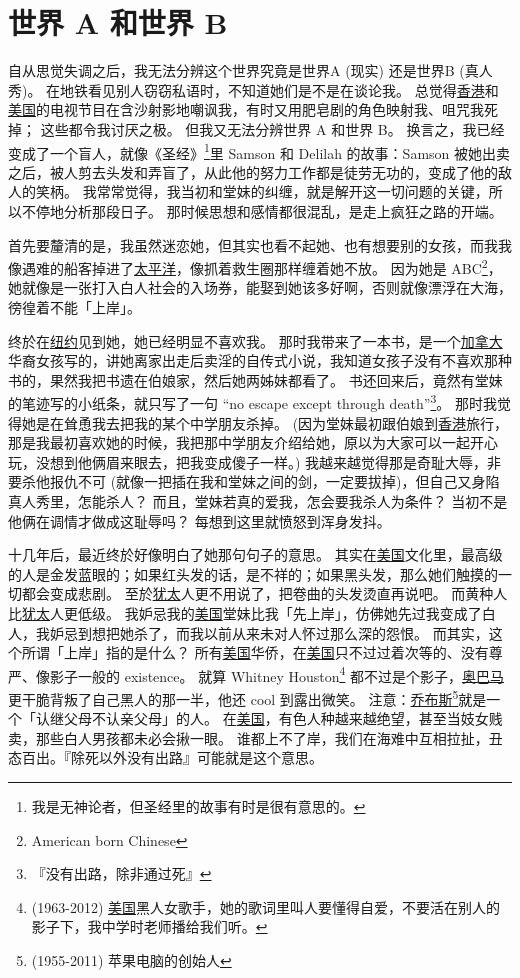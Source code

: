 \documentclass[12pt]{report}
\begin{document}
\chapter{世界 A 和世界 B}

自从思觉失调之后，我无法分辨这个世界究竟是世界A (现实) 还是世界B (真人秀)。 在地铁看见别人窃窃私语时，不知道她们是不是在谈论我。 总觉得\uline{香港}和\uline{美国}的电视节目在含沙射影地嘲讽我，有时又用肥皂剧的角色映射我、咀咒我死掉； 这些都令我讨厌之极。 但我又无法分辨世界 A 和世界 B。 换言之，我已经变成了一个盲人，就像《圣经》\footnote{我是无神论者，但圣经里的故事有时是很有意思的。}里 Samson 和 Delilah 的故事：Samson 被她出卖之后，被人剪去头发和弄盲了，从此他的努力工作都是徒劳无功的，变成了他的敌人的笑柄。 我常常觉得，我当初和堂妹的纠缠，就是解开这一切问题的关键，所以不停地分析那段日子。 那时候思想和感情都很混乱，是走上疯狂之路的开端。

首先要釐清的是，我虽然迷恋她，但其实也看不起她、也有想要别的女孩，而我我像遇难的船客掉进了\uline{太平洋}，像抓着救生圈那样缠着她不放。 因为她是 ABC\footnote{American born Chinese}，她就像是一张打入白人社会的入场券，能娶到她该多好啊，否则就像漂浮在大海，徬徨着不能「上岸」。

终於在\uline{纽约}见到她，她已经明显不喜欢我。 那时我带来了一本书，是一个\uline{加拿大}华裔女孩写的，讲她离家出走后卖淫的自传式小说，我知道女孩子没有不喜欢那种书的，果然我把书遗在伯娘家，然后她两姊妹都看了。 书还回来后，竟然有堂妹的笔迹写的小纸条，就只写了一句 ``no escape except through death''\footnote{『没有出路，除非通过死』}。 那时我觉得她是在耸恿我去把我的某个中学朋友杀掉。 (因为堂妹最初跟伯娘到\uline{香港}旅行，那是我最初喜欢她的时候，我把那中学朋友介绍给她，原以为大家可以一起开心玩，没想到他俩眉来眼去，把我变成傻子一样。) 我越来越觉得那是奇耻大辱，非要杀他报仇不可 (就像一把插在我和堂妹之间的剑，一定要拔掉)，但自己又身陷真人秀里，怎能杀人？ 而且，堂妹若真的爱我，怎会要我杀人为条件？ 当初不是他俩在调情才做成这耻辱吗？ 每想到这里就愤怒到浑身发抖。

十几年后，最近终於好像明白了她那句句子的意思。 其实在\uline{美国}文化里，最高级的人是金发蓝眼的；如果红头发的话，是不祥的；如果黑头发，那么她们触摸的一切都会变成悲剧。 至於\uline{犹太}人更不用说了，把卷曲的头发烫直再说吧。 而黄种人比\uline{犹太}人更低级。 我妒忌我的\uline{美国}堂妹比我「先上岸」，仿佛她先过我变成了白人，我妒忌到想把她杀了，而我以前从来未对人怀过那么深的怨恨。 而其实，这个所谓「上岸」指的是什么？ 所有\uline{美国}华侨，在\uline{美国}只不过过着次等的、没有尊严、像影子一般的 existence。 就算 Whitney Houston\footnote{(1963-2012) \uline{美国}黑人女歌手，她的歌词里叫人要懂得自爱，不要活在别人的影子下，我中学时老师播给我们听。} 都不过是个影子，\uline{奥巴马}更干脆背叛了自己黑人的那一半，他还 cool 到露出微笑。  注意：\uline{乔布斯}\footnote{(1955-2011) 苹果电脑的创始人}就是一个「认继父母不认亲父母」的人。 在\uline{美国}，有色人种越来越绝望，甚至当妓女贱卖，那些白人男孩都未必会揪一眼。 谁都上不了岸，我们在海难中互相拉扯，丑态百出。『除死以外没有出路』可能就是这个意思。
\end{document}
